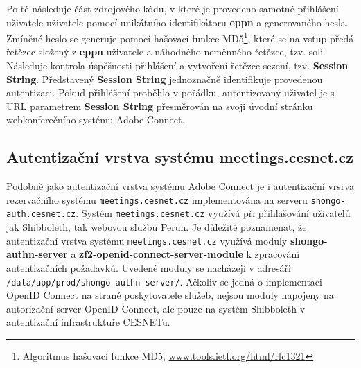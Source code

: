 \documentclass[
  printed, %
  twoside, %
  table,   %
  nolof,     %
  nolot,     %
]{fithesis3}
\begin{document}
Po té následuje část zdrojového kódu, v které je provedeno samotné přihlášení uživatele uživatele pomocí unikátního identifikátoru \textbf{eppn} a generovaného hesla. Zmíněné heslo se generuje pomocí hašovací funkce MD5\footnote{Algoritmus hašovací funkce MD5, \url{www.tools.ietf.org/html/rfc1321}}, které se na vstup předá řetězec složený z \textbf{eppn} uživatele a náhodného neměnného řetězce, tzv. soli. Následuje kontrola úspěšnosti přihlášení a vytvoření řetězce sezení, tzv. \textbf{Session String}. Představený \textbf{Session String} jednoznačně identifikuje provedenou autentizaci. Pokud přihlášení proběhlo v pořádku, autentizovaný uživatel je s URL parametrem \textbf{Session String} přesměrován na svoji úvodní stránku webkonferečního systému Adobe Connect.      

\subsection{Autentizační vrstva systému meetings.cesnet.cz}
\label{meetings-old}
Podobně jako autentizační vrstva systému Adobe Connect je i autentizační vrsrva rezervačního systému \texttt{meetings.cesnet.cz} implementována na serveru \texttt{shongo-auth.cesnet.cz}. Systém \texttt{meetings.cesnet.cz} využívá při přihlašování uživatelů jak Shibboleth, tak webovou službu Perun. Je důležité poznamenat, že autentizační vrstva systému \texttt{meetings.cesnet.cz} využívá moduly \textbf{shongo-authn-server} a \textbf{zf2-openid-connect-server-module} k zpracování autentizačních požadavků. Uvedené moduly se nacházejí v adresáři \texttt{/data/app/prod/shongo-authn-server/}. Ačkoliv se jedná o implementaci OpenID Connect na straně poskytovatele služeb, nejsou moduly napojeny na autorizační server OpenID Connect, ale pouze na systém Shibboleth v autentizační infrastruktuře CESNETu. \par
\end{document}
